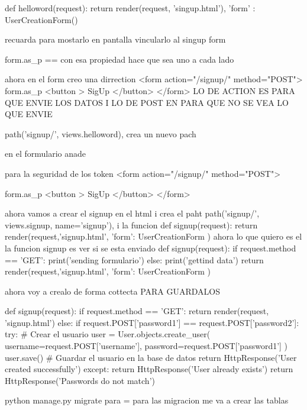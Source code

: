   def helloword(request):
 return render(request, 'singup.html'), {
    'form' : UserCreationForm()
 } 

 recuarda para mostarlo en pantalla vincularlo al singup {{form}}


 {{form.as_p}} == con esa propiedad hace que sea uno a cada lado


 ahora en el form creo una dirrection 
 <form action="/signup/" method="POST">
    {{form.as_p}}
    <button >
        SigUp 
    </button>
</form> LO DE ACTION ES PARA QUE ENVIE LOS DATOS I LO DE POST EN PARA QUE NO SE VEA LO QUE ENVIE 

path('signup/', views.helloword), crea un nuevo pach 

en el formulario anade 
{%
para la seguridad de los token 
<form action="/signup/" method="POST">
    {%
    {{form.as_p}}
    <button >
        SigUp 
    </button>
</form>


ahora vamos a crear el signup en el html i crea el paht 
path('signup/', views.signup, name='signup'),
i la funcion 
def signup(request):
    return render(request,'signup.html', {
        'form': UserCreationForm
    })
ahora lo que quiero es el la funcion signup es ver si se esta enviado 
def signup(request):
    if request.method == 'GET':
        print('sending formulario')
    else:
        print('gettind data')
    return render(request,'signup.html', {
        'form': UserCreationForm
    })

ahora voy a crealo de forma cottecta PARA GUARDALOS


def signup(request):
    if request.method == 'GET':
        return render(request, 'signup.html')
    else:
        if request.POST['password1'] == request.POST['password2']:
            try:
                # Crear el usuario
                user = User.objects.create_user(
                    username=request.POST['username'],
                    password=request.POST['password1']
                )
                user.save()  # Guardar el usuario en la base de datos
                return HttpResponse('User created successfully')
            except:
                return HttpResponse('User already exists')
        return HttpResponse('Passwords do not match')

python manage.py migrate para   = para las migracion me va a crear las tablas 



}}
